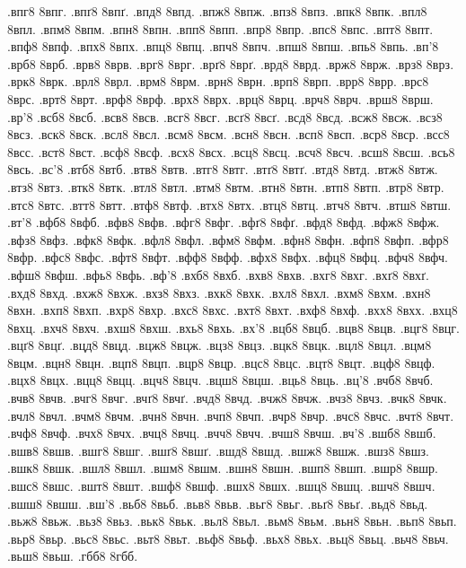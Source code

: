 {.впг8
8впг.
.впґ8
8впґ.
.впд8
8впд.
.впж8
8впж.
.впз8
8впз.
.впк8
8впк.
.впл8
8впл.
.впм8
8впм.
.впн8
8впн.
.впп8
8впп.
.впр8
8впр.
.впс8
8впс.
.впт8
8впт.
.впф8
8впф.
.впх8
8впх.
.впц8
8впц.
.впч8
8впч.
.впш8
8впш.
.впь8
8впь.
.вп'8
.врб8
8врб.
.врв8
8врв.
.врг8
8врг.
.врґ8
8врґ.
.врд8
8врд.
.врж8
8врж.
.врз8
8врз.
.врк8
8врк.
.врл8
8врл.
.врм8
8врм.
.врн8
8врн.
.врп8
8врп.
.врр8
8врр.
.врс8
8врс.
.врт8
8врт.
.врф8
8врф.
.врх8
8врх.
.врц8
8врц.
.врч8
8врч.
.врш8
8врш.
.вр'8
.всб8
8всб.
.всв8
8всв.
.всг8
8всг.
.всґ8
8всґ.
.всд8
8всд.
.всж8
8всж.
.всз8
8всз.
.вск8
8вск.
.всл8
8всл.
.всм8
8всм.
.всн8
8всн.
.всп8
8всп.
.вср8
8вср.
.всс8
8всс.
.вст8
8вст.
.всф8
8всф.
.всх8
8всх.
.всц8
8всц.
.всч8
8всч.
.всш8
8всш.
.всь8
8всь.
.вс'8
.втб8
8втб.
.втв8
8втв.
.втг8
8втг.
.втґ8
8втґ.
.втд8
8втд.
.втж8
8втж.
.втз8
8втз.
.втк8
8втк.
.втл8
8втл.
.втм8
8втм.
.втн8
8втн.
.втп8
8втп.
.втр8
8втр.
.втс8
8втс.
.втт8
8втт.
.втф8
8втф.
.втх8
8втх.
.втц8
8втц.
.втч8
8втч.
.втш8
8втш.
.вт'8
.вфб8
8вфб.
.вфв8
8вфв.
.вфг8
8вфг.
.вфґ8
8вфґ.
.вфд8
8вфд.
.вфж8
8вфж.
.вфз8
8вфз.
.вфк8
8вфк.
.вфл8
8вфл.
.вфм8
8вфм.
.вфн8
8вфн.
.вфп8
8вфп.
.вфр8
8вфр.
.вфс8
8вфс.
.вфт8
8вфт.
.вфф8
8вфф.
.вфх8
8вфх.
.вфц8
8вфц.
.вфч8
8вфч.
.вфш8
8вфш.
.вфь8
8вфь.
.вф'8
.вхб8
8вхб.
.вхв8
8вхв.
.вхг8
8вхг.
.вхґ8
8вхґ.
.вхд8
8вхд.
.вхж8
8вхж.
.вхз8
8вхз.
.вхк8
8вхк.
.вхл8
8вхл.
.вхм8
8вхм.
.вхн8
8вхн.
.вхп8
8вхп.
.вхр8
8вхр.
.вхс8
8вхс.
.вхт8
8вхт.
.вхф8
8вхф.
.вхх8
8вхх.
.вхц8
8вхц.
.вхч8
8вхч.
.вхш8
8вхш.
.вхь8
8вхь.
.вх'8
.вцб8
8вцб.
.вцв8
8вцв.
.вцг8
8вцг.
.вцґ8
8вцґ.
.вцд8
8вцд.
.вцж8
8вцж.
.вцз8
8вцз.
.вцк8
8вцк.
.вцл8
8вцл.
.вцм8
8вцм.
.вцн8
8вцн.
.вцп8
8вцп.
.вцр8
8вцр.
.вцс8
8вцс.
.вцт8
8вцт.
.вцф8
8вцф.
.вцх8
8вцх.
.вцц8
8вцц.
.вцч8
8вцч.
.вцш8
8вцш.
.вць8
8вць.
.вц'8
.вчб8
8вчб.
.вчв8
8вчв.
.вчг8
8вчг.
.вчґ8
8вчґ.
.вчд8
8вчд.
.вчж8
8вчж.
.вчз8
8вчз.
.вчк8
8вчк.
.вчл8
8вчл.
.вчм8
8вчм.
.вчн8
8вчн.
.вчп8
8вчп.
.вчр8
8вчр.
.вчс8
8вчс.
.вчт8
8вчт.
.вчф8
8вчф.
.вчх8
8вчх.
.вчц8
8вчц.
.вчч8
8вчч.
.вчш8
8вчш.
.вч'8
.вшб8
8вшб.
.вшв8
8вшв.
.вшг8
8вшг.
.вшґ8
8вшґ.
.вшд8
8вшд.
.вшж8
8вшж.
.вшз8
8вшз.
.вшк8
8вшк.
.вшл8
8вшл.
.вшм8
8вшм.
.вшн8
8вшн.
.вшп8
8вшп.
.вшр8
8вшр.
.вшс8
8вшс.
.вшт8
8вшт.
.вшф8
8вшф.
.вшх8
8вшх.
.вшц8
8вшц.
.вшч8
8вшч.
.вшш8
8вшш.
.вш'8
.вьб8
8вьб.
.вьв8
8вьв.
.вьг8
8вьг.
.вьґ8
8вьґ.
.вьд8
8вьд.
.вьж8
8вьж.
.вьз8
8вьз.
.вьк8
8вьк.
.вьл8
8вьл.
.вьм8
8вьм.
.вьн8
8вьн.
.вьп8
8вьп.
.вьр8
8вьр.
.вьс8
8вьс.
.вьт8
8вьт.
.вьф8
8вьф.
.вьх8
8вьх.
.вьц8
8вьц.
.вьч8
8вьч.
.вьш8
8вьш.
.гбб8
8гбб.
}
